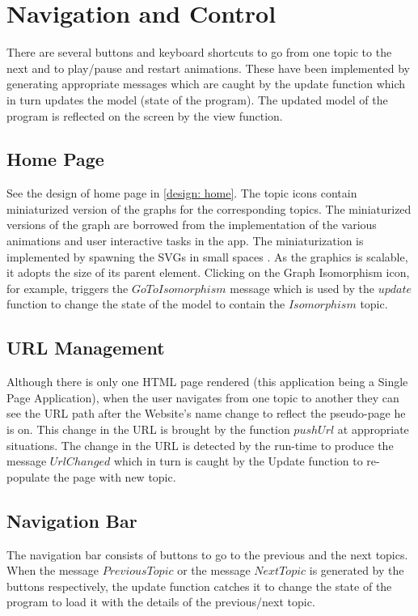 \section{Navigation and Control}
There are several buttons and keyboard shortcuts to go from one topic to the
next and to play/pause and restart animations. These have been implemented by
generating appropriate messages which are caught by the update function which
in turn updates the model (state of the program). The updated model of the
program is reflected on the screen by the view function.

\subsection{Home Page}
See the design of home page in \autoref{design: home}.  The topic icons contain
miniaturized version of the graphs for the corresponding topics. The
miniaturized versions of the graph are borrowed from the implementation of the
various animations and user interactive tasks in the app.  The miniaturization
is implemented by spawning the SVGs in small spaces . As the graphics is
scalable, it adopts the size of its parent element.  Clicking on the Graph
Isomorphism icon, for example, triggers the $GoToIsomorphism$ message which is
used by the $update$ function to change the state of the model to contain the
$Isomorphism$ topic.


\subsection{URL Management}
Although there is only one HTML page rendered (this application being a Single
Page Application), when the user navigates from one topic to another they can see
the URL path after the Website's name change to reflect the pseudo-page he is
on. This change in the URL is brought by the function $pushUrl$ at appropriate
situations.  The change in the URL is detected by the run-time to produce the
message $UrlChanged$ which in turn is caught by the Update function to
re-populate the page with new topic.

\subsection{Navigation Bar}
The navigation bar consists of buttons to go to the previous and the next
topics.  When the message $PreviousTopic$ or the message $NextTopic$ is
generated by the buttons respectively, the update function catches it to change
the state of the program to load it with the
details of the previous/next topic.

